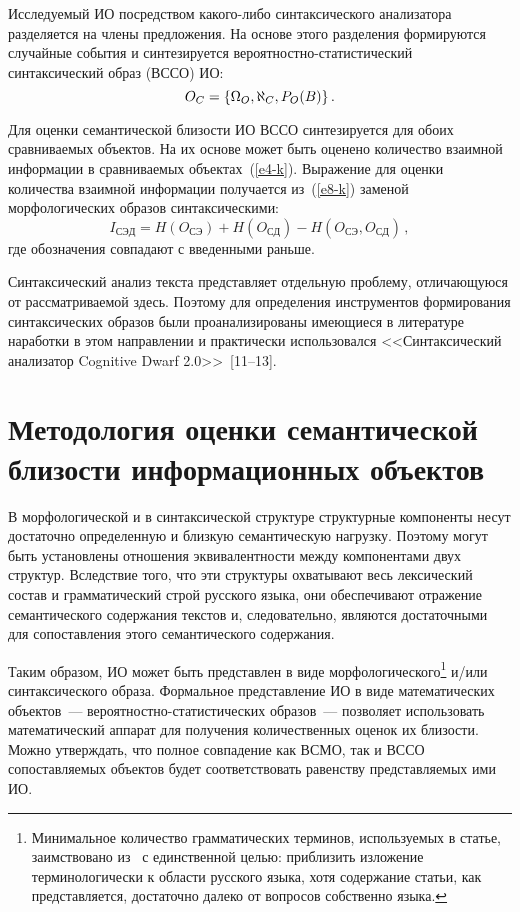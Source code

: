 \begin{multicols}{2}
Исследуемый ИО посредством какого-либо синтаксического анализатора 
разделяется на члены предложения. На основе этого разделения 
формируются случайные события и синтезируется вероятностно-статистический 
синтаксический образ (ВССО) ИО:
\begin{equation}
O_C=\{\Omega_O,\aleph_C,P_O(B)\}\,.
\label{e10-k}
\end{equation}
   
   Для оценки семантической близости ИО ВССО 
синтезируется для обоих сравниваемых объектов. На их основе может быть 
оценено количество взаимной информации в сравниваемых 
объектах~(\ref{e4-k}). Выражение для оценки количества взаимной 
информации получается из~(\ref{e8-k}) заменой морфологических образов 
син\-так\-си\-че\-скими:
   \begin{equation}
I_{\mathrm{СЭД}} = H(O_{\mathrm{СЭ}}) + H(O_{\mathrm{СД}})- 
H(O_{\mathrm{СЭ}}, O_{\mathrm{СД}})\,,
\label{e11-k}
\end{equation}
где обозначения совпадают с введенными раньше. 
   
   Синтаксический анализ текста представляет отдельную проблему, 
отличающуюся от рассматриваемой здесь. Поэтому для определения 
инструментов формирования синтаксических образов были 
проанализированы имеющиеся в литературе наработки в этом направлении и 
практически использовался <<Синтаксический анализатор Cognitive 
Dwarf 2.0>>~[11--13].

\vspace*{-0.9pt}

\section{Методология оценки семантической близости информационных объектов}
   
   В морфологической и в синтаксической структуре структурные 
компоненты несут достаточно определенную и близкую семантическую 
нагрузку. Поэтому могут быть установлены отношения эквивалентности 
между компонентами двух структур. Вследствие того, что эти структуры 
охватывают весь лексический состав и грамматический строй русского 
языка, они обеспечивают отражение семантического содержания текстов и, 
следовательно, являются достаточными для сопоставления этого 
семантического содержания. 
   
   Таким образом, ИО может быть представлен в виде 
морфологического\addtolength{\footnotesep}{1.351pt}\footnote{Минимальное количество грамматических терминов, 
используемых в статье, заимствовано из~\cite{8-k} с единственной целью: приблизить 
изложение терминологически к области русского языка, хотя содержание статьи, как 
представляется, достаточно далеко от вопросов собственно языка.}\addtolength{\footnotesep}{-1.351pt} и/или 
синтаксического образа. Формальное представление ИО в виде 
математических объектов~--- ве\-ро\-ят\-но\-ст\-но-ста\-ти\-сти\-че\-ских 
образов~--- позволяет использовать математический аппарат для получения 
количественных оценок их близости. Можно утверждать, что полное 
совпадение как ВСМО, так и ВССО со\-по\-став\-ля\-емых объектов будет 
соответствовать равенству представляемых ими ИО. 


\end{multicols}
